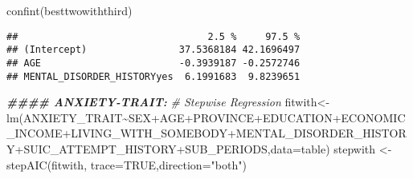 \documentclass[
]{book}
\newenvironment{Shaded}{\begin{snugshade}}{\end{snugshade}}
\newcommand{\AttributeTok}[1]{\textcolor[rgb]{0.77,0.63,0.00}{#1}}
\newcommand{\CommentTok}[1]{\textcolor[rgb]{0.56,0.35,0.01}{\textit{#1}}}
\newcommand{\ConstantTok}[1]{\textcolor[rgb]{0.00,0.00,0.00}{#1}}
\newcommand{\DocumentationTok}[1]{\textcolor[rgb]{0.56,0.35,0.01}{\textbf{\textit{#1}}}}
\newcommand{\FunctionTok}[1]{\textcolor[rgb]{0.00,0.00,0.00}{#1}}
\newcommand{\NormalTok}[1]{#1}
\newcommand{\OtherTok}[1]{\textcolor[rgb]{0.56,0.35,0.01}{#1}}
\newcommand{\SpecialCharTok}[1]{\textcolor[rgb]{0.00,0.00,0.00}{#1}}
\newcommand{\StringTok}[1]{\textcolor[rgb]{0.31,0.60,0.02}{#1}}
\begin{document}
\begin{Shaded}
\begin{Highlighting}[]
\FunctionTok{confint}\NormalTok{(besttwowiththird)}
\end{Highlighting}
\end{Shaded}

\begin{verbatim}
##                                 2.5 %     97.5 %
## (Intercept)                37.5368184 42.1696497
## AGE                        -0.3939187 -0.2572746
## MENTAL_DISORDER_HISTORYyes  6.1991683  9.8239651
\end{verbatim}

\begin{Shaded}
\begin{Highlighting}[]
\DocumentationTok{\#\#\#\# ANXIETY{-}TRAIT:}
\CommentTok{\# Stepwise Regression}
\NormalTok{fitwith}\OtherTok{\textless{}{-}}\FunctionTok{lm}\NormalTok{(ANXIETY\_TRAIT}\SpecialCharTok{\textasciitilde{}}\NormalTok{SEX}\SpecialCharTok{+}\NormalTok{AGE}\SpecialCharTok{+}\NormalTok{PROVINCE}\SpecialCharTok{+}\NormalTok{EDUCATION}\SpecialCharTok{+}\NormalTok{ECONOMIC\_INCOME}\SpecialCharTok{+}\NormalTok{LIVING\_WITH\_SOMEBODY}\SpecialCharTok{+}\NormalTok{MENTAL\_DISORDER\_HISTORY}\SpecialCharTok{+}\NormalTok{SUIC\_ATTEMPT\_HISTORY}\SpecialCharTok{+}\NormalTok{SUB\_PERIODS,}\AttributeTok{data=}\NormalTok{table)}
\NormalTok{stepwith }\OtherTok{\textless{}{-}} \FunctionTok{stepAIC}\NormalTok{(fitwith, }\AttributeTok{trace=}\ConstantTok{TRUE}\NormalTok{,}\AttributeTok{direction=}\StringTok{"both"}\NormalTok{)}
\end{Highlighting}
\end{Shaded}
\end{document}
